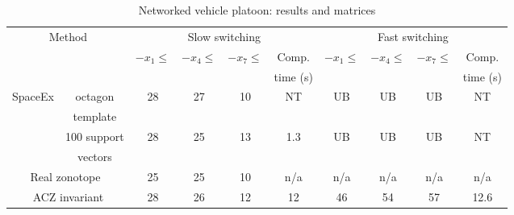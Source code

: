 %
%
\begin{table}
\begin{tabular}{|l|c|c|c|c|c|c|c|c|c|}
\hline
\multicolumn{2}{|c|}{\multirow{4}{*}{Method}} & \multicolumn{4}{|c|}{\multirow{2}{*}{Slow switching}} & \multicolumn{4}{|c|}{\multirow{2}{*}{Fast switching}}\\
\multicolumn{2}{|c|}{} & \multicolumn{4}{|c|}{} & \multicolumn{4}{|c|}{} \\
\cline{3-10}
\multicolumn{2}{|c|}{} & \multirow{2}{*}{$-x_1\leq$} & \multirow{2}{*}{$-x_4\leq$} & \multirow{2}{*}{$-x_7\leq$} & Comp. & \multirow{2}{*}{$-x_1\leq$} & \multirow{2}{*}{$-x_4\leq$} & \multirow{2}{*}{$-x_7\leq$} & Comp.\\
\multicolumn{2}{|c|}{} & & & & time (s) & & & & time (s)\\
\hline
\multirow{4}{*}{SpaceEx} & octagon & \multirow{2}{*}{28} &
\multirow{2}{*}{27} & \multirow{2}{*}{10} &
\multirow{2}{*}{NT} & \multirow{2}{*}{UB} &
\multirow{2}{*}{UB} & \multirow{2}{*}{UB} &
\multirow{2}{*}{NT}\\
& template & & & & & & & &\\
\cline{2-10}
& 100 support & \multirow{2}{*}{28} & \multirow{2}{*}{25} &
\multirow{2}{*}{13} & \multirow{2}{*}{1.3} & \multirow{2}{*}{UB} & \multirow{2}{*}{UB} &
\multirow{2}{*}{UB} & \multirow{2}{*}{NT}\\
& vectors & & & & & & & &\\
\hline
\multicolumn{2}{|c|}{\multirow{2}{*}{Real zonotope~\cite{makhlouf2014networked}}} &
\multirow{2}{*}{25} & \multirow{2}{*}{25} & \multirow{2}{*}{10}
 & \multirow{2}{*}{n/a} & \multirow{2}{*}{n/a} & \multirow{2}{*}{n/a} & \multirow{2}{*}{n/a}
 & \multirow{2}{*}{n/a}\\
\multicolumn{2}{|c|}{} & & & & & & & &\\
\hline
\multicolumn{2}{|c|}{\multirow{2}{*}{ACZ invariant}} &
\multirow{2}{*}{28} & \multirow{2}{*}{26} &
\multirow{2}{*}{12} & \multirow{2}{*}{12} &
\multirow{2}{*}{46} & \multirow{2}{*}{54} &
\multirow{2}{*}{57} & \multirow{2}{*}{12.6}\\
\multicolumn{2}{|c|}{} & & & & & & & &\\
\hline
\end{tabular}
%
\caption{Networked
  vehicle platoon: results and matrices}
~\label{tab:largedwell-platoon}
\vspace{-4em}
\end{table}

